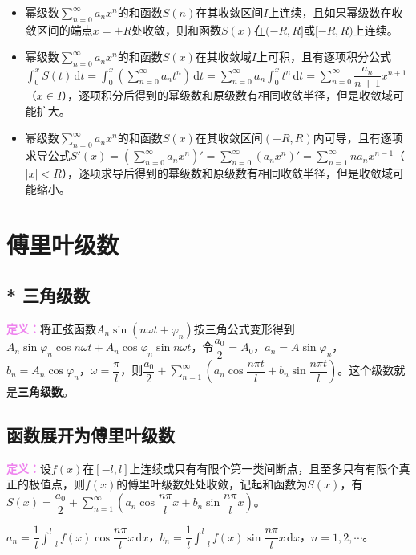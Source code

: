 \documentclass[UTF8, 12pt]{ctexart}
\begin{document}
\begin{itemize}
    \item 幂级数$\sum\limits_{n=0}^\infty a_nx^n$的和函数$S(n)$在其收敛区间$I$上连续，且如果幂级数在收敛区间的端点$x=\pm R$处收敛，则和函数$S(x)$在$(-R,R]$或$[-R,R)$上连续。
    \item 幂级数$\sum\limits_{n=0}^\infty a_nx^n$的和函数$S(x)$在其收敛域$I$上可积，且有逐项积分公式$\int_0^xS(t)\,\textrm{d}t=\int_0^x(\sum\limits_{n=0}^\infty a_nt^n)\,\textrm{d}t=\sum\limits_{n=0}^\infty a_n\int_0^xt^n\,\textrm{d}t=\sum\limits_{n=0}^\infty\dfrac{a_n}{n+1}x^{n+1}$（$x\in I$），逐项积分后得到的幂级数和原级数有相同收敛半径，但是收敛域可能扩大。
    \item 幂级数$\sum\limits_{n=0}^\infty a_nx^n$的和函数$S(x)$在其收敛区间$(-R,R)$内可导，且有逐项求导公式$S'(x)=(\sum\limits_{n=0}^\infty a_nx^n)'=\sum\limits_{n=0}^\infty(a_nx^n)'=\sum\limits_{n=1}^\infty na_nx^{n-1}$（$\vert x\vert<R$），逐项求导后得到的幂级数和原级数有相同收敛半径，但是收敛域可能缩小。
\end{itemize}

\section{傅里叶级数}

\subsection{* 三角级数}

\textcolor{violet}{\textbf{定义：}}将正弦函数$A_n\sin(n\omega t+\varphi_n)$按三角公式变形得到$A_n\sin\varphi_n\cos n\omega t+A_n\cos\varphi_n\sin n\omega t$，令$\dfrac{a_0}{2}=A_0$，$a_n=A\sin\varphi_n$，$b_n=A_n\cos\varphi_n$，$\omega=\dfrac{\pi}{l}$，则$\dfrac{a_0}{2}+\sum\limits_{n=1}^\infty\left(a_n\cos\dfrac{n\pi t}{l}+b_n\sin\dfrac{n\pi t}{l}\right)$。这个级数就是\textbf{三角级数}。

\subsection{函数展开为傅里叶级数}

\textcolor{violet}{\textbf{定义：}}设$f(x)$在$[-l,l]$上连续或只有有限个第一类间断点，且至多只有有限个真正的极值点，则$f(x)$的傅里叶级数处处收敛，记起和函数为$S(x)$，有$S(x)=\dfrac{a_0}{2}+\sum\limits_{n=1}^\infty\left(a_n\cos\dfrac{n\pi}{l}x+b_n\sin\dfrac{n\pi}{l}x\right)$。

$\displaystyle{a_n=\dfrac{1}{l}\int_{-l}^lf(x)\cos\dfrac{n\pi}{l}x\,\textrm{d}x}$，$\displaystyle{b_n=\dfrac{1}{l}\int_{-l}^lf(x)\sin\dfrac{n\pi}{l}x\,\textrm{d}x}$，$n=1,2,\cdots$。
\end{document}
